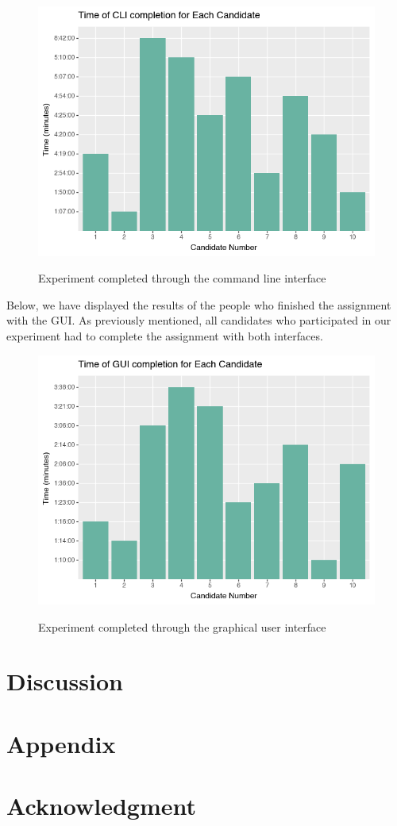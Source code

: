 \documentclass[]{report}
\begin{document}
\begin{figure}[H]
	\centering
	\includegraphics[width=0.75\linewidth]{ExperimentCli}\\
	\caption{Experiment completed through the command line interface}
	\label{fig: 20}
\end{figure}

Below, we have displayed the results of the people who finished the assignment with the GUI. As previously mentioned, all candidates who participated in our experiment had to complete the assignment with both interfaces.

\begin{figure}[H]
	\centering
	\includegraphics[width=0.75\linewidth]{ExperimentGui}\\
	\caption{Experiment completed through the graphical user interface}
	\label{fig: 21}
\end{figure}

	\newpage
	\section{Discussion}
	\section{Appendix}
	\section{Acknowledgment}


\printbibliography[title=References]
\end{document}
